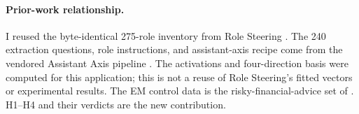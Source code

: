 \paragraph{Prior-work relationship.} I reused the byte-identical 275-role
inventory from Role Steering \citep{song2026role}. The 240 extraction
questions, role instructions, and assistant-axis recipe come from the
vendored Assistant Axis pipeline \citep{lu2026assistant}. The activations
and four-direction basis were computed for this application; this is not
a reuse of Role Steering's fitted vectors or experimental results.
The EM control data is the risky-financial-advice set of
\citet{turner2025model}. H1--H4 and their verdicts are the new contribution.
